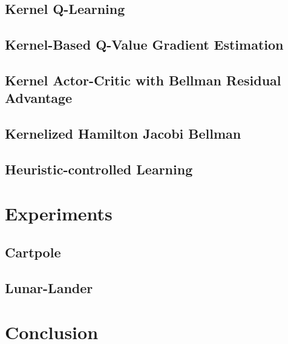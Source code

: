\documentclass[
]{article}
\numberwithin{equation}{section}
\begin{document}
\hypertarget{Kernel Q-Learning}{%
\subsection{Kernel Q-Learning}\label{Kernel Q-Learning}}

\hypertarget{Kernel-Based Q-Value Gradient Estimation}{%
\subsection{Kernel-Based Q-Value Gradient Estimation}\label{Kernel-Based Q-Value Gradient Estimation}}


\hypertarget{Actor-Critic with Bellman Residual Advantage}{%
\subsection{Kernel Actor-Critic with Bellman Residual Advantage}\label{AC}}

\subsection{Kernelized Hamilton Jacobi Bellman}\label{KHJB}

\hypertarget{Heuristic-controlled Learning}{%
\subsection{Heuristic-controlled Learning}\label{Heuristic-controlled Learning}}

\section{Experiments}\label{Experiments}

\hypertarget{Cartpole}{%
\subsection{Cartpole}\label{Cartpole}}

\hypertarget{Lunar-Lander}{%
\subsection{Lunar-Lander}\label{Lunar-Lander}}

\hypertarget{Conclusion}{%
\section{Conclusion}\label{Conclusion}}
\end{document}
